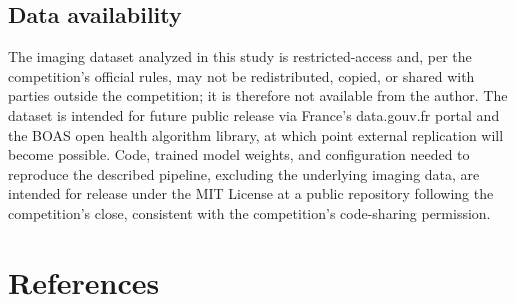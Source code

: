 \documentclass[11pt]{article}
\begin{document}
\subsection*{Data availability}
The imaging dataset analyzed in this study is restricted-access and, per the competition's official rules, may not be redistributed, copied, or shared with parties outside the competition; it is therefore not available from the author. The dataset is intended for future public release via France's data.gouv.fr portal and the BOAS open health algorithm library, at which point external replication will become possible. Code, trained model weights, and configuration needed to reproduce the described pipeline, excluding the underlying imaging data, are intended for release under the MIT License at a public repository following the competition's close, consistent with the competition's code-sharing permission.

\bigskip
\section*{References}
\end{document}
